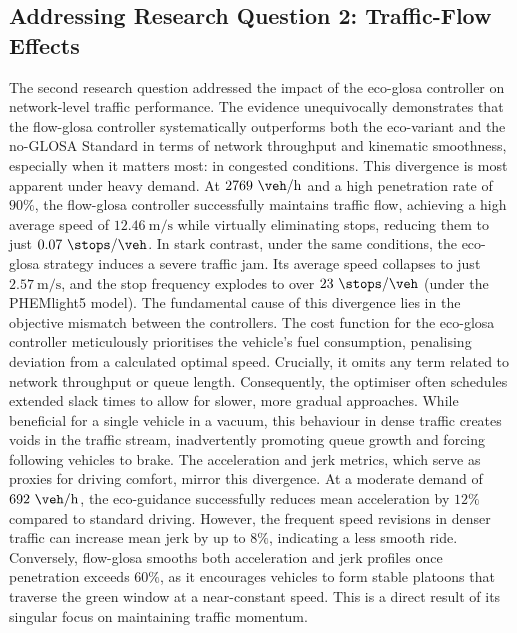 \subsection*{Addressing Research Question 2: Traffic-Flow Effects}
The second research question addressed the impact of the \ac{eco-glosa} controller on network-level traffic performance. The evidence unequivocally demonstrates that the \ac{flow-glosa} controller systematically outperforms both the eco-variant and the no-GLOSA Standard in terms of network throughput and kinematic smoothness, especially when it matters most: in congested conditions.
\mynewline
This divergence is most apparent under heavy demand. At $2769~\unit{\veh\per\hour}$ and a high penetration rate of $90\%$, the \ac{flow-glosa} controller successfully maintains traffic flow, achieving a high average speed of $12.46~\unit{\metre\per\second}$ while virtually eliminating stops, reducing them to just $0.07~\unit{\stops\per\veh}$. In stark contrast, under the same conditions, the \ac{eco-glosa} strategy induces a severe traffic jam. Its average speed collapses to just $2.57~\unit{\metre\per\second}$, and the stop frequency explodes to over $23~\unit{\stops\per\veh}$ (under the PHEMlight5 model).
\mynewline
The fundamental cause of this divergence lies in the objective mismatch between the controllers. The cost function for the \ac{eco-glosa} controller meticulously prioritises the vehicle's fuel consumption, penalising deviation from a calculated optimal speed. Crucially, it omits any term related to network throughput or queue length. Consequently, the optimiser often schedules extended slack times to allow for slower, more gradual approaches. While beneficial for a single vehicle in a vacuum, this behaviour in dense traffic creates voids in the traffic stream, inadvertently promoting queue growth and forcing following vehicles to brake.
\mynewline
The acceleration and jerk metrics, which serve as proxies for driving comfort, mirror this divergence. At a moderate demand of $692~\unit{\veh\per\hour}$, the eco-guidance successfully reduces mean acceleration by $12\%$ compared to standard driving. However, the frequent speed revisions in denser traffic can increase mean jerk by up to $8\%$, indicating a less smooth ride. Conversely, \ac{flow-glosa} smooths both acceleration and jerk profiles once penetration exceeds $60\%$, as it encourages vehicles to form stable platoons that traverse the green window at a near-constant speed. This is a direct result of its singular focus on maintaining traffic momentum.
\mynewline
